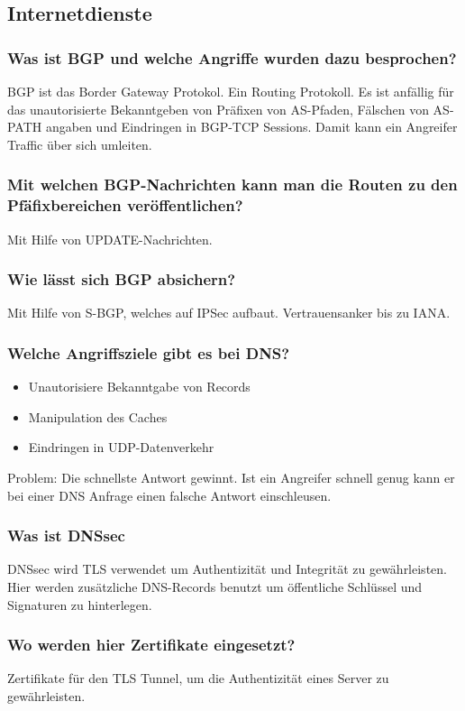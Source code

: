 	\subsection{Internetdienste}
	
		\subsubsection{Was ist BGP und welche Angriffe wurden dazu besprochen?}
	BGP ist das Border Gateway Protokol. Ein Routing Protokoll. Es ist anfällig für das unautorisierte Bekanntgeben von Präfixen von AS-Pfaden, Fälschen von AS-PATH angaben und Eindringen in BGP-TCP Sessions.
	Damit kann ein Angreifer Traffic über sich umleiten. 

	
	
	\subsubsection{Mit welchen BGP-Nachrichten kann man die Routen zu den Pfäfixbereichen veröffentlichen?}
	Mit Hilfe von UPDATE-Nachrichten.
	
	\subsubsection{Wie lässt sich BGP absichern?}
	Mit Hilfe von S-BGP, welches auf IPSec aufbaut. Vertrauensanker bis zu IANA.
	
	\subsubsection{Welche Angriffsziele gibt es bei DNS?}
	\begin{itemize}
		\item Unautorisiere Bekanntgabe von Records
		\item Manipulation des Caches
		\item Eindringen in UDP-Datenverkehr
	\end{itemize}
	Problem: Die schnellste Antwort gewinnt. Ist ein Angreifer schnell genug kann er bei einer DNS Anfrage einen falsche Antwort einschleusen.
	\subsubsection{Was ist DNSsec}
	DNSsec wird TLS verwendet um Authentizität und Integrität zu gewährleisten.
	Hier werden zusätzliche DNS-Records benutzt um öffentliche Schlüssel und Signaturen zu hinterlegen.
	
	\subsubsection{Wo werden hier Zertifikate eingesetzt?}
	Zertifikate für den TLS Tunnel, um die Authentizität eines Server zu gewährleisten. 
	

